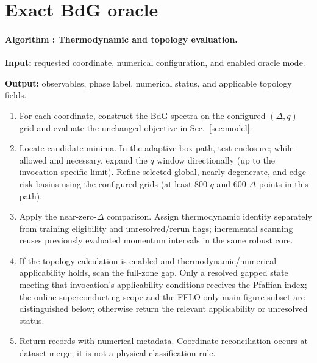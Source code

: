 \section{Exact BdG oracle}
\noindent\begin{minipage}{\textwidth}
\label{alg:oracle}\paragraph{Algorithm \thealgorithm: Thermodynamic and topology evaluation.}
\textbf{Input:} requested coordinate, numerical configuration, and enabled oracle mode.\par\textbf{Output:} observables, phase label, numerical status, and applicable topology fields.
\begin{enumerate}
\item For each coordinate, construct the BdG spectra on the configured $(\Delta,q)$ grid and evaluate the unchanged objective in Sec.~\ref{sec:model}.
\item Locate candidate minima. In the adaptive-box path, test enclosure; while allowed and necessary, expand the $q$ window directionally (up to the invocation-specific limit). Refine selected global, nearly degenerate, and edge-risk basins using the configured grids (at least 800 $q$ and 600 $\Delta$ points in this path).
\item Apply the near-zero-$\Delta$ comparison. Assign thermodynamic identity separately from training eligibility and unresolved/rerun flags; incremental scanning reuses previously evaluated momentum intervals in the same robust core.
\item If the topology calculation is enabled and thermodynamic/numerical applicability holds, scan the full-zone gap. Only a resolved gapped state meeting that invocation's applicability conditions receives the Pfaffian index; the online superconducting scope and the FFLO-only main-figure subset are distinguished below; otherwise return the relevant applicability or unresolved status.
\item Return records with numerical metadata. Coordinate reconciliation occurs at dataset merge; it is not a physical classification rule.
\end{enumerate}
\end{minipage}\par


